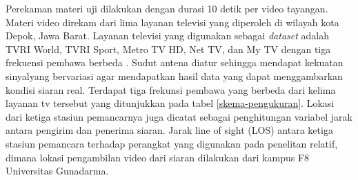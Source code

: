 Perekaman materi uji dilakukan dengan durasi 10 detik per video tayangan. Materi video direkam dari lima layanan televisi yang diperoleh di wilayah kota  Depok, Jawa Barat. Layanan televisi yang digunakan sebagai \textit{dataset} adalah TVRI World, TVRI Sport, Metro TV HD, Net TV, dan My TV dengan tiga frekuensi pembawa berbeda . Sudut antena diatur sehingga mendapat kekuatan sinyalyang bervariasi agar mendapatkan hasil data yang dapat menggambarkan kondisi siaran real. Terdapat tiga frekunsi pembawa yang berbeda dari kelima layanan tv tersebut yang ditunjukkan pada tabel \ref{skema-pengukuran}. Lokasi dari ketiga stasiun pemancarnya juga dicatat sebagai penghitungan variabel jarak antara pengirim dan penerima siaran. Jarak line of sight (LOS) antara ketiga stasiun pemancara terhadap perangkat yang digunakan pada penelitan relatif, dimana lokasi pengambilan video dari siaran dilakukan dari kampus F8 Universitas Gunadarma.

